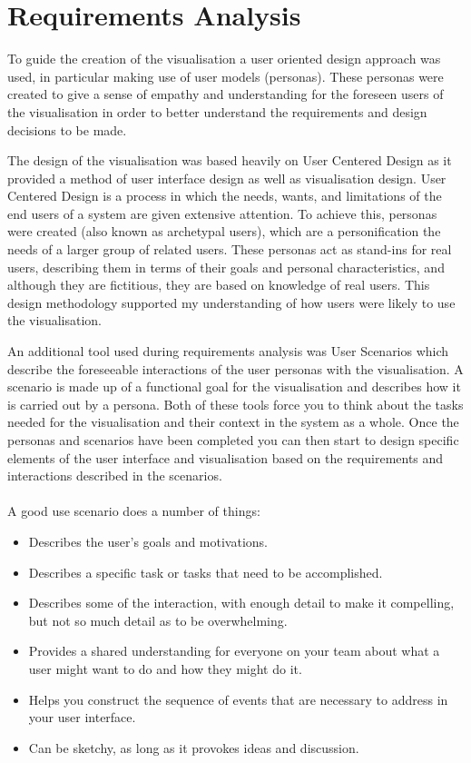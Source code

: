 \chapter{Requirements Analysis}\label{Chap:ra}
To guide the creation of the visualisation a user oriented design approach was
used, in particular making use of user models (personas). These personas were
created to give a sense of empathy and understanding for the foreseen users of
the visualisation in order to better understand the requirements and design
decisions to be made. 

The design of the visualisation was based heavily on User Centered Design as it
provided a method of user interface design as well as visualisation design. User
Centered Design is a process in which the needs, wants, and limitations of the
end users of a system are given extensive attention. To achieve this, personas
were created (also known as archetypal users), which are a personification the
needs of a larger group of related users. These personas act as stand-ins for
real users, describing them in terms of their goals and personal
characteristics, and although they are fictitious, they are based on knowledge
of real users. This design methodology supported my understanding of how users
were likely to use the visualisation.

An additional tool used during requirements analysis was User Scenarios which
describe the foreseeable interactions of the user personas with the
visualisation. A scenario is made up of a functional goal for the visualisation
and describes how it is carried out by a persona. Both of these tools force you
to think about the tasks needed for the visualisation and their context in the
system as a whole. Once the personas and scenarios have been completed you can
then start to design specific elements of the user interface and visualisation
based on the requirements and interactions described in the scenarios.
\\\\
A good use scenario does a number of things:
\begin{itemize}
 \item Describes the user's goals and motivations.
  \item Describes a specific task or tasks that need to be accomplished.
   \item Describes some of the interaction, with enough detail to make it
compelling, but not so much detail as to be overwhelming.
    \item Provides a shared understanding for everyone on your team about what a
user might want to do and how they might do it.
     \item Helps you construct the sequence of events that are necessary to
address in your user interface.
     \item Can be sketchy, as long as it provokes ideas and discussion.
\end{itemize}


